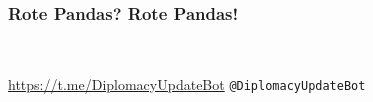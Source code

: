 \documentclass[handout]{beamer}
\begin{document}
\begin{frame}[fragile]
    \frametitle{Rote Pandas? Rote Pandas!}

    \hfill
    \hfill
    \hfill
    \\[.0133333\linewidth-.1ex]
    \hfill
    \hfill
    \hfill

    \url{https://t.me/DiplomacyUpdateBot} \hfill \texttt{@DiplomacyUpdateBot}
\end{frame}
\end{document}
